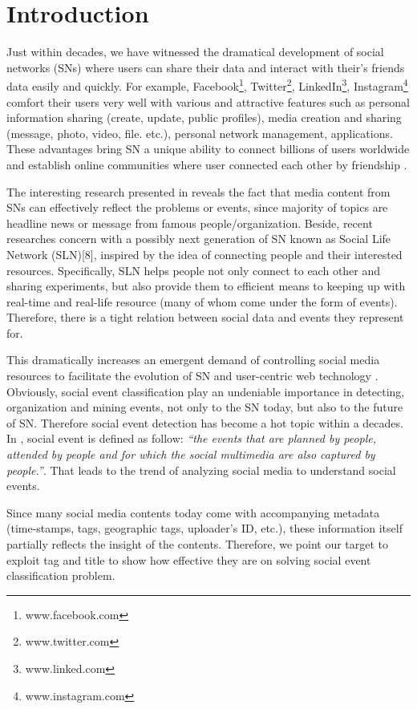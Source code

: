 \documentclass{llncs}
\begin{document}
\section{Introduction}
%
Just within decades, we have witnessed the dramatical development of social networks (SNs) where users can share their data and interact with their's friends data easily and quickly.  For example, Facebook\footnote{www.facebook.com}, Twitter\footnote{www.twitter.com}, LinkedIn\footnote{www.linked.com}, Instagram\footnote{www.instagram.com}  comfort their users very well with various and attractive features such as personal information sharing (create, update, public profiles), media creation and sharing (message, photo, video, file. etc.), personal network management, applications. These advantages bring SN a unique ability to connect billions of users worldwide and establish online communities where user connected each other by friendship \cite{ellison2007social}. 

The interesting research presented in \cite{kwak2010twitter} reveals the fact that media content from SNs can effectively reflect the problems or events, since majority of topics are headline news or message from famous people/organization. Beside, recent researches concern with a possibly next generation of SN known as Social Life Network (SLN)[8], inspired by the idea of connecting people and their interested resources. Specifically, SLN helps people not only connect to each other and sharing experiments, but also provide them to efficient means to keeping up with real-time and real-life resource (many of whom come under the form of events). Therefore, there is a tight relation between social data and events they represent for. 

This dramatically increases an emergent demand of controlling social media resources to facilitate the evolution of SN and user-centric web technology \cite{kwak2010twitter}. Obviously, social event classification play an undeniable importance in detecting, organization and mining events, not only to the SN today, but also to the future of SN. Therefore social event detection has become a hot topic within a decades. In \cite{reuter2013social}, social event is defined as follow: \textit{“the events that are planned by people, attended by people and for which the social multimedia are also captured by people.”}. That leads to the trend of analyzing social media to understand social events. 

Since many social media contents today come with accompanying metadata (time-stamps, tags, geographic tags, uploader’s ID, etc.), these information itself partially reflects the insight of the contents. Therefore, we point our target to exploit tag and title to show how effective they are on solving social event classification problem. 
\end{document}
